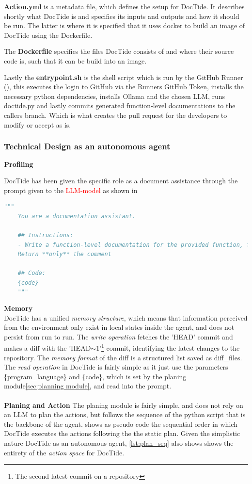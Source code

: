 \textbf{Action.yml} is a metadata file, which defines the setup for DocTide. It describes shortly what DocTide is and specifies its inputs and outputs and how it should be run. The latter is where it is specified that it uses docker to build an image of DocTide using the Dockerfile. 

The \textbf{Dockerfile} specifies the files DocTide consists of and where their source code is, such that it can be build into an image. 

Lastly the \textbf{entrypoint.sh} is the shell script which is run by the GitHub Runner (), this executes the login to GitHub via the Runners GitHub Token, installs the necessary python dependencies, installs Ollama and the chosen LLM, runs doctide.py and lastly commits generated function-level documentations to the callers branch. Which is what creates the pull request for the developers to modify or accept as is.
\subsubsection{Technical Design as an autonomous agent}
\textbf{Profiling}

DocTide has been given the specific role as a document assistance through the prompt given to the \textcolor{red}{LLM-model} as shown in 

\begin{lstlisting}[language=Python, label={lst:prompt}, caption=Prompt used for the LLM]
    """
    You are a documentation assistant.

    ## Instructions:
    - Write a function-level documentation for the provided function, following best documentation practice for {program_language}
    Return **only** the comment

    ## Code:
    {code}
    """
\end{lstlisting}
\textbf{Memory}
\\
DocTide has a unified \textit{memory structure}, which means that information perceived from the environment only exist in local states inside the agent, and does not persist from run to run. The \textit{write operation} fetches the 'HEAD' commit and makes a diff with the 'HEAD\(\sim \)1'\footnote{The second latest commit on a repository} commit, identifying the latest changes to the repository. The \textit{memory format} of the diff is a structured list saved as diff\_files. The \textit{read operation} in DocTide is fairly simple as it just use the parameters \{program\_language\} and \{code\}, which is set by the planing module\ref{sec:planning module}, and read into the prompt.
\\ \\
\textbf{Planing and Action}
\label{sec:planning module}
The planing module is fairly simple, and does not rely on an LLM to plan the actions, but follows the sequence of the python script that is the backbone of the agent.  shows as pseudo code the sequential order in which DocTide executes the actions following the the static plan. Given the simplistic nature DocTide as an autonomous agent, \ref{lst:plan_seq} also shows shows the entirety of the \textit{action space} for DocTide.

